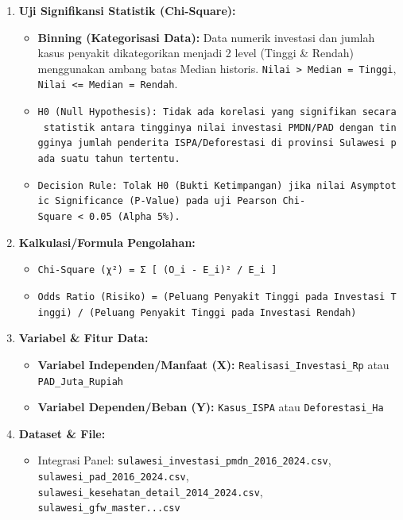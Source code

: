 \documentclass[
]{article}
\providecommand{\tightlist}{%
  \setlength{\itemsep}{0pt}\setlength{\parskip}{0pt}}
\begin{document}
\begin{enumerate}
\def\labelenumi{\arabic{enumi}.}
\tightlist
\item
  \textbf{Uji Signifikansi Statistik (Chi-Square):}

  \begin{itemize}
  \tightlist
  \item
    \textbf{Binning (Kategorisasi Data):} Data numerik investasi dan
    jumlah kasus penyakit dikategorikan menjadi 2 level (Tinggi \&
    Rendah) menggunakan ambang batas Median historis.
    \texttt{Nilai\ \textgreater{}\ Median\ =\ Tinggi},
    \texttt{Nilai\ \textless{}=\ Median\ =\ Rendah}.
  \item
    \texttt{H0\ (Null\ Hypothesis):\ Tidak\ ada\ korelasi\ yang\ signifikan\ secara\ statistik\ antara\ tingginya\ nilai\ investasi\ PMDN/PAD\ dengan\ tingginya\ jumlah\ penderita\ ISPA/Deforestasi\ di\ provinsi\ Sulawesi\ pada\ suatu\ tahun\ tertentu.}
  \item
    \texttt{Decision\ Rule:\ Tolak\ H0\ (Bukti\ Ketimpangan)\ jika\ nilai\ Asymptotic\ Significance\ (P-Value)\ pada\ uji\ Pearson\ Chi-Square\ \textless{}\ 0.05\ (Alpha\ 5\%).}
  \end{itemize}
\item
  \textbf{Kalkulasi/Formula Pengolahan:}

  \begin{itemize}
  \tightlist
  \item
    \texttt{Chi-Square\ (χ²)\ =\ Σ\ {[}\ (O\_i\ -\ E\_i)²\ /\ E\_i\ {]}}
  \item
    \texttt{Odds\ Ratio\ (Risiko)\ =\ (Peluang\ Penyakit\ Tinggi\ pada\ Investasi\ Tinggi)\ /\ (Peluang\ Penyakit\ Tinggi\ pada\ Investasi\ Rendah)}
  \end{itemize}
\item
  \textbf{Variabel \& Fitur Data:}

  \begin{itemize}
  \tightlist
  \item
    \textbf{Variabel Independen/Manfaat (X):}
    \texttt{Realisasi\_Investasi\_Rp} atau \texttt{PAD\_Juta\_Rupiah}
  \item
    \textbf{Variabel Dependen/Beban (Y):} \texttt{Kasus\_ISPA} atau
    \texttt{Deforestasi\_Ha}
  \end{itemize}
\item
  \textbf{Dataset \& File:}

  \begin{itemize}
  \tightlist
  \item
    Integrasi Panel: \texttt{sulawesi\_investasi\_pmdn\_2016\_2024.csv},
    \texttt{sulawesi\_pad\_2016\_2024.csv},
    \texttt{sulawesi\_kesehatan\_detail\_2014\_2024.csv},
    \texttt{sulawesi\_gfw\_master...csv}
  \end{itemize}
\end{enumerate}
\end{document}
